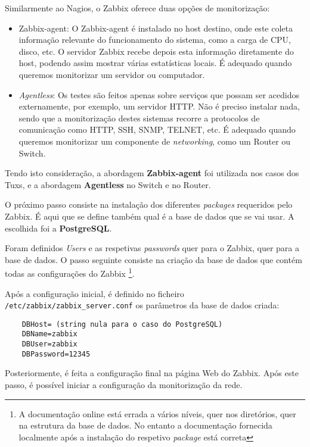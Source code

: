 Similarmente ao Nagios, o Zabbix oferece duas opções de monitorização:

\begin{itemize}
    \item Zabbix-agent: O Zabbix-agent é instalado no host destino, onde este coleta informação relevante do funcionamento do sistema, como a carga de CPU, disco, etc.
    O servidor Zabbix recebe depois esta informação diretamente do host, podendo assim mostrar várias estatísticas locais. É adequado quando queremos monitorizar um servidor ou computador.
    \item \textit{Agentless}: Os testes são feitos apenas sobre serviços que possam ser acedidos externamente, por exemplo, um servidor HTTP.
    Não é preciso instalar nada, sendo que a monitorização destes sistemas recorre a protocolos de comunicação como HTTP, SSH, SNMP, TELNET, etc. É adequado quando queremos monitorizar um componente de \textit{networking}, como um Router ou Switch.
\end{itemize}

Tendo isto consideração, a abordagem \textbf{Zabbix-agent} foi utilizada nos casos dos Tuxs, e a abordagem \textbf{Agentless} no Switch e no Router.

O próximo passo consiste na instalação dos diferentes \textit{packages} requeridos pelo Zabbix.
É aqui que se define também qual é a base de dados que se vai usar. A escolhida foi a \textbf{PostgreSQL}.

Foram definidos \textit{Users} e as respetivas \textit{passwords} quer para o Zabbix, quer para a base de dados.
O passo seguinte consiste na criação da base de dados que contém todas as configurações do Zabbix \footnote{A documentação online está errada a vários níveis, quer nos diretórios, quer na estrutura da base de dados.
No entanto a documentação fornecida localmente após a instalação do respetivo \textit{package} está correta}.

Após a configuração inicial, é definido no ficheiro \verb|/etc/zabbix/zabbix_server.conf| os parâmetros da base de dados criada:

\begin{lstlisting}
    DBHost= (string nula para o caso do PostgreSQL)
    DBName=zabbix
    DBUser=zabbix
    DBPassword=12345
\end{lstlisting}

Posteriormente, é feita a configuração final na página Web do Zabbix.
Após este passo, é possível iniciar a configuração da monitorização da rede.

